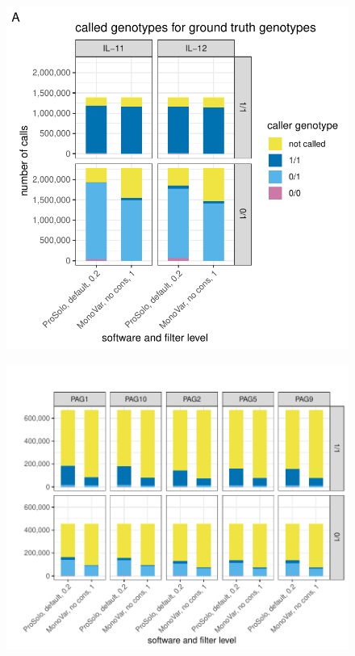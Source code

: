 \documentclass[authoryear,preprint,11pt]{scrartcl}
\begin{document}
\begin{figure}[!tpb]
 \begin{minipage}{.45\linewidth}
  \includegraphics[width=\linewidth]{figs/Dong2017/Dong2017_genotyping_calls_per_ground_truth_prosolo_monovar.pdf} \\
  \end{minipage}
 \begin{minipage}{.53\linewidth}
  \includegraphics[width=\linewidth]{figs/Laehnemann2017/Laehnemann2017_genotyping_calls_per_ground_truth_prosolo_monovar.pdf} \\

\end{minipage}
\end{figure}
\end{document}
